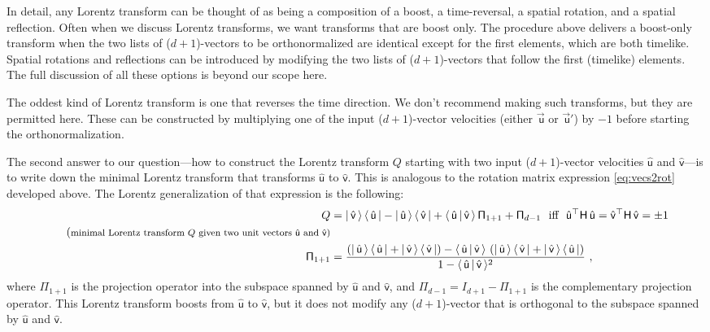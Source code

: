 \documentclass{article}
\newcommand{\metric}{\mathsf{H}}
\newcommand{\proj}{\mathsf{\Pi}}
\newcommand\upvec[1]{\!\vec{\,\mathrm{#1}}}
\newcommand{\Lvec}[1]{\upvec{\mathsf{#1}}} %
\newcommand{\Lhat}[1]{\hat{\mathsf{#1}}} %
\newcommand{\braket}[2]{\langle\,{#1}\,|\,{#2}\,\rangle}
\newcommand{\ketbra}[2]{|\,{#1}\,\rangle\,\langle\,{#2}\,|}
\newcommand{\plus}{\!+\!} %
\begin{document}
In detail, any Lorentz transform can be thought of as being a composition of a boost, a time-reversal, a spatial rotation, and a spatial reflection.
Often when we discuss Lorentz transforms, we want transforms that are boost only.
The procedure above delivers a boost-only transform when the two lists of ($d\plus1$)-vectors to be orthonormalized are identical except for the first elements, which are both timelike.
Spatial rotations and reflections can be introduced by modifying the two lists of ($d\plus1$)-vectors that follow the first (timelike) elements.
The full discussion of all these options is beyond our scope here.

The oddest kind of Lorentz transform is one that reverses the time direction.
We don't recommend making such transforms, but they are permitted here.
These can be constructed by multiplying one of the input ($d\plus1$)-vector velocities (either $\Lvec{u}$ or $\Lvec{u}'$) by $-1$ before starting the orthonormalization.

The second answer to our question---how to construct the Lorentz transform $Q$ starting with two input ($d\plus1$)-vector velocities $\Lhat{u}$ and $\Lhat{v}$---is to write down the minimal Lorentz transform that transforms $\Lhat{u}$ to $\Lhat{v}$.
This is analogous to the rotation matrix expression \eqref{eq:vecs2rot} developed above.
The Lorentz generalization of that expression is the following:
\begin{align}
    Q &= \ketbra{\Lhat{v}}{\Lhat{u}} - \ketbra{\Lhat{u}}{\Lhat{v}} + \braket{\Lhat{u}}{\Lhat{v}}\,\proj_{1+1} + \proj_{d-1} ~~ \mbox{iff} ~~ \Lhat{u}^\top\metric\,\Lhat{u} = \Lhat{v}^\top\metric\,\Lhat{v} = \pm 1 \label{eq:vecs2LT} \\
    \tag{\footnotesize minimal Lorentz transform $Q$ given two unit vectors $\Lhat{u}$ and $\Lhat{v}$} \\
    \proj_{1+1} &= \frac{\left(\ketbra{\Lhat{u}}{\Lhat{u}} + \ketbra{\Lhat{v}}{\Lhat{v}}\right) - \braket{\Lhat{u}}{\Lhat{v}}\,\left(\ketbra{\Lhat{u}}{\Lhat{v}} + \ketbra{\Lhat{v}}{\Lhat{u}}\right)}{1 - \braket{\Lhat{u}}{\Lhat{v}}^2} ~,
\end{align}
where $\proj_{1+1}$ is the projection operator into the subspace spanned by $\Lhat{u}$ and $\Lhat{v}$,
and $\proj_{d-1} = I_{d+1} - \proj_{1+1}$ is the complementary projection operator.
This Lorentz transform boosts from $\Lhat{u}$ to $\Lhat{v}$, but it does not modify any ($d\plus1$)-vector that is orthogonal to the subspace spanned by $\Lhat{u}$ and $\Lhat{v}$.
\end{document}
